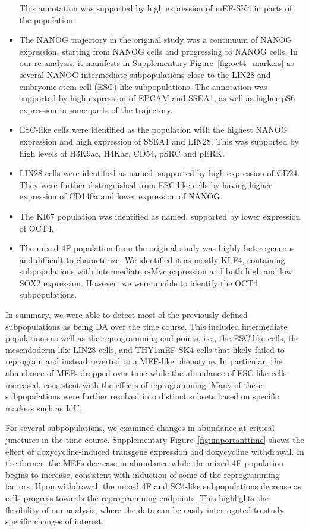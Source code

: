 \documentclass{article}
\begin{document}
\begin{itemize}
        This annotation was supported by high expression of mEF-SK4 in parts of the population.
    \item The NANOG\hi{} trajectory in the original study was a continuum of NANOG expression, starting from NANOG\lo{} cells and progressing to NANOG\hi{} cells.
        In our re-analysis, it manifests in Supplementary Figure~\ref{fig:oct4_markers} as several NANOG-intermediate subpopulations close to the LIN28\hi{} and embryonic stem cell (ESC)-like subpopulations.
        The annotation was supported by high expression of EPCAM and SSEA1, as well as higher pS6 expression in some parts of the trajectory.
    \item ESC-like cells were identified as the population with the highest NANOG expression and high expression of SSEA1 and LIN28.
        This was supported by high levels of H3K9ac, H4Kac, CD54, pSRC and pERK.
    \item LIN28\hi{} cells were identified as named, supported by high expression of CD24.
They were further distinguished from ESC-like cells by having higher expression of CD140a and lower expression of NANOG.
    \item The KI67\hi{} population was identified as named, supported by lower expression of OCT4.
    \item The mixed 4F population from the original study was highly heterogeneous and difficult to characterize.
We identified it as mostly KLF4\lo{}, containing subpopulations with intermediate c-Myc expression and both high and low SOX2 expression.
However, we were unable to identify the OCT4\lo{} subpopulations.
\end{itemize}
In summary, we were able to detect most of the previously defined subpopulations as being DA over the time course.
This included intermediate populations as well as the reprogramming end points, i.e., the ESC-like cells, the mesendoderm-like LIN28\hi{} cells, and THY1\hi{}mEF-SK4\hi{} cells that likely failed to reprogram and instead reverted to a MEF-like phenotype.
In particular, the abundance of MEFs dropped over time while the abundance of ESC-like cells increased, consistent with the effects of reprogramming.
Many of these subpopulations were further resolved into distinct subsets based on specific markers such as IdU.

For several subpopulations, we examined changes in abundance at critical junctures in the time course.
Supplementary Figure~\ref{fig:importanttime} shows the effect of doxycycline-induced transgene expression and doxycycline withdrawal.
In the former, the MEFs decrease in abundance while the mixed 4F population begins to increase, consistent with induction of some of the reprogramming factors.
Upon withdrawal, the mixed 4F and SC4-like subpopulations decrease as cells progress towards the reprogramming endpoints.
This highlights the flexibility of our analysis, where the data can be easily interrogated to study specific changes of interest.
\end{document}
